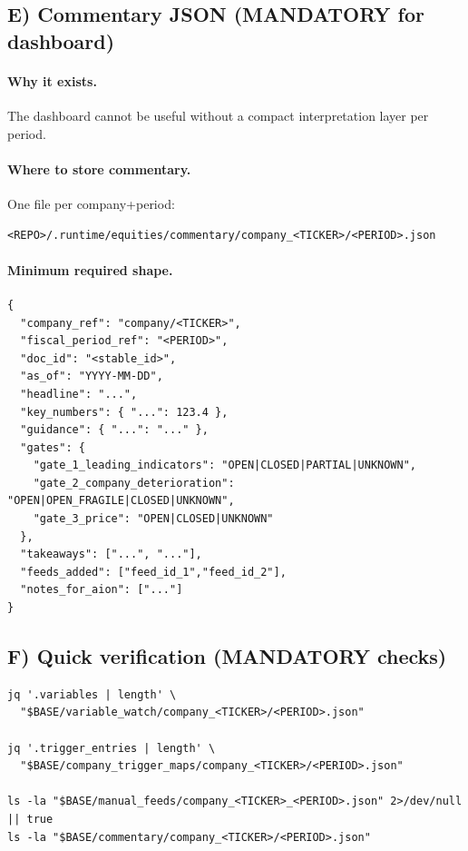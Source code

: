 \subsection*{E) Commentary JSON (MANDATORY for dashboard)}
\paragraph{Why it exists.}
The dashboard cannot be useful without a compact interpretation layer per period.

\paragraph{Where to store commentary.}
One file per company+period:
\begin{verbatim}
<REPO>/.runtime/equities/commentary/company_<TICKER>/<PERIOD>.json
\end{verbatim}

\paragraph{Minimum required shape.}
\begin{verbatim}
{
  "company_ref": "company/<TICKER>",
  "fiscal_period_ref": "<PERIOD>",
  "doc_id": "<stable_id>",
  "as_of": "YYYY-MM-DD",
  "headline": "...",
  "key_numbers": { "...": 123.4 },
  "guidance": { "...": "..." },
  "gates": {
    "gate_1_leading_indicators": "OPEN|CLOSED|PARTIAL|UNKNOWN",
    "gate_2_company_deterioration": "OPEN|OPEN_FRAGILE|CLOSED|UNKNOWN",
    "gate_3_price": "OPEN|CLOSED|UNKNOWN"
  },
  "takeaways": ["...", "..."],
  "feeds_added": ["feed_id_1","feed_id_2"],
  "notes_for_aion": ["..."]
}
\end{verbatim}

\subsection*{F) Quick verification (MANDATORY checks)}
\begin{verbatim}
jq '.variables | length' \
  "$BASE/variable_watch/company_<TICKER>/<PERIOD>.json"

jq '.trigger_entries | length' \
  "$BASE/company_trigger_maps/company_<TICKER>/<PERIOD>.json"

ls -la "$BASE/manual_feeds/company_<TICKER>_<PERIOD>.json" 2>/dev/null || true
ls -la "$BASE/commentary/company_<TICKER>/<PERIOD>.json"
\end{verbatim}

